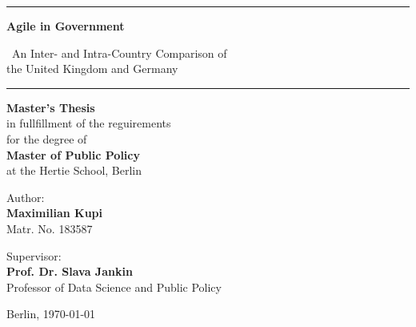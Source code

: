 \begin{titlepage}
\begin{center}
\vspace*{2cm}
	\hrule
	\vspace{1cm}
	{\huge\bfseries Agile in Government}\\ 
	\vspace{0.3cm}
	{\LARGE \ An Inter- and Intra-Country Comparison of \\the United Kingdom and Germany\par}
	\vspace{1cm}
	\hrule \vspace{1cm}
%
\vspace{1cm}
    {\normalsize 
   	\textbf{Master's Thesis} \\\vspace{0.5cm}
   	in fullfillment of the reguirements\\
    for the degree of \\\vspace{0.5cm}
   	{\bf Master of Public Policy}\\\vspace{0.5cm}
   	{ at the Hertie School, Berlin}}
   	
\vspace{2cm}


\begin{minipage}[t]{0.4\textwidth}
	\begin{flushleft} \large
		\normalsize{Author:\\
			\bf{Maximilian Kupi}}\\
			{Matr. No. 183587}
	\end{flushleft}
\end{minipage}
\begin{minipage}[t]{0.4\textwidth}
	\begin{flushright} \large
		\normalsize{Supervisor:\\
		\bf{Prof. Dr. Slava Jankin}}\\
		{Professor of Data Science and Public Policy}
	\end{flushright}
\end{minipage}\vspace{1cm}

\end{center}
\vspace{2cm}
\begin{center}

	Berlin, \today
\end{center}


\end{titlepage}